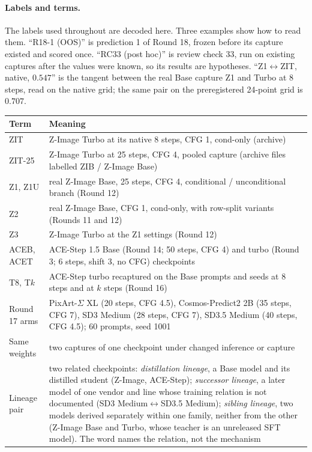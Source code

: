 \documentclass[11pt]{article}
\newcommand{\TT}{ZIT-25}%
\begin{document}
\paragraph{Labels and terms.}\label{sec:labels} The labels used throughout are decoded here. Three examples show how to read them. ``R18-1 (OOS)'' is prediction 1 of Round 18, frozen before its capture existed and scored once. ``RC33 (post hoc)'' is review check 33, run on existing captures after the values were known, so its results are hypotheses. ``Z1$\leftrightarrow$ZIT, native, $0.547$'' is the tangent between the real Base capture Z1 and Turbo at 8 steps, read on the native grid; the same pair on the preregistered 24-point grid is $0.707$.

{\small\noindent
\begin{tabularx}{\linewidth}{@{}lL@{}}
\toprule
Term & Meaning\\
\midrule
ZIT & Z-Image Turbo at its native 8 steps, CFG 1, cond-only (archive)\\
\TT{} & Z-Image Turbo at 25 steps, CFG 4, pooled capture (archive files labelled ZIB / Z-Image Base)\\
Z1, Z1U & real Z-Image Base, 25 steps, CFG 4, conditional / unconditional branch (Round 12)\\
Z2 & real Z-Image Base, CFG 1, cond-only, with row-split variants (Rounds 11 and 12)\\
Z3 & Z-Image Turbo at the Z1 settings (Round 12)\\
ACEB, ACET & ACE-Step 1.5 Base (Round 14; 50 steps, CFG 4) and turbo (Round 3; 6 steps, shift 3, no CFG) checkpoints\\
T8, T$k$ & ACE-Step turbo recaptured on the Base prompts and seeds at 8 steps and at $k$ steps (Round 16)\\
Round 17 arms & PixArt-$\Sigma$ XL (20 steps, CFG 4.5), Cosmos-Predict2 2B (35 steps, CFG 7), SD3 Medium (28 steps, CFG 7), SD3.5 Medium (40 steps, CFG 4.5); 60 prompts, seed 1001\\
Same weights & two captures of one checkpoint under changed inference or capture\\
Lineage pair & two related checkpoints: \emph{distillation lineage}, a Base model and its distilled student (Z-Image, ACE-Step); \emph{successor lineage}, a later model of one vendor and line whose training relation is not documented (SD3 Medium$\leftrightarrow$SD3.5 Medium); \emph{sibling lineage}, two models derived separately within one family, neither from the other (Z-Image Base and Turbo, whose teacher is an unreleased SFT model). The word names the relation, not the mechanism\\

\end{tabularx}}
\end{document}
